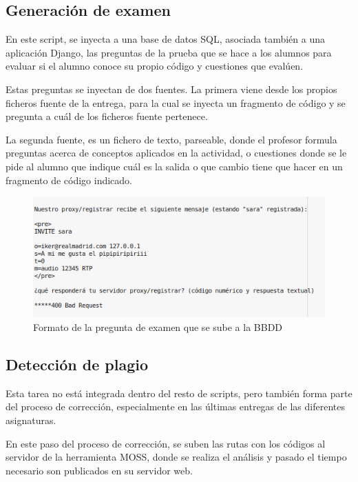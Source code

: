 \subsection{Generación de examen}
\label{sec:gen_exam}

En este script, se inyecta a una base de datos SQL, asociada también a una aplicación Django, las preguntas de la prueba que se hace a los alumnos para evaluar si el alumno conoce su propio código y cuestiones que evalúen.


Estas preguntas se inyectan de dos fuentes. La primera viene desde los propios ficheros fuente de la entrega, para la cual se inyecta un fragmento de código y se pregunta a cuál de los ficheros fuente pertenece.


La segunda fuente, es un fichero de texto, parseable, donde el profesor formula preguntas acerca de conceptos aplicados en la actividad, o cuestiones donde se le pide al alumno que indique cuál es la salida o que cambio tiene que hacer en un fragmento de código indicado.

\begin{figure}[H]
   \centering
   \includegraphics[width=16cm]{img/Selection_020_expregunta}
   \caption{Formato de la pregunta de examen que se sube a la BBDD}
   \label{figura:formato_examen}
\end{figure}

\subsection{Detección de plagio}
\label{sec:detec_plagio}

Esta tarea no está integrada dentro del resto de scripts, pero también forma parte del proceso de corrección, especialmente en las últimas entregas de las diferentes asignaturas.

En este paso del proceso de corrección, se suben las rutas con los códigos al servidor de la herramienta MOSS, donde se realiza el análisis y pasado el tiempo necesario son publicados en su servidor web.

